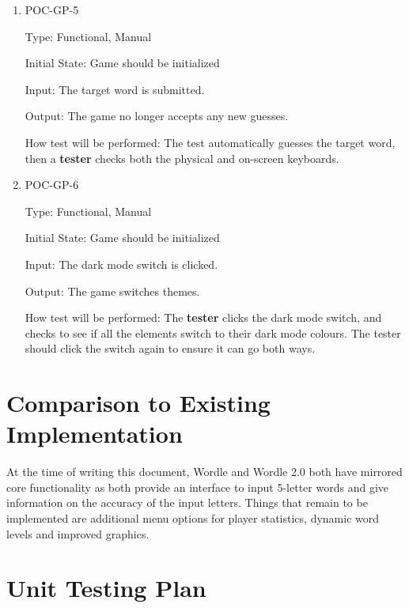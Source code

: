 \documentclass[12pt, titlepage]{article}
\begin{document}
\begin{enumerate}
\item{POC-GP-5}

Type: Functional, Manual
					
Initial State: Game should be initialized
					
Input: The target word is submitted.
					
Output: The game no longer accepts any new guesses.
					
How test will be performed: The test automatically guesses the target word, 
then a \textbf{tester} checks both the physical and on-screen keyboards.  

\item{POC-GP-6}

Type: Functional, Manual
					
Initial State: Game should be initialized
					
Input: The dark mode switch is clicked.
					
Output: The game switches themes.
					
How test will be performed: The \textbf{tester} clicks the dark mode switch,
and checks to see if all the elements switch to their dark mode colours. The tester
should click the switch again to ensure it can go both ways.

\end{enumerate}

	
\section{Comparison to Existing Implementation}	
At the time of writing this document, Wordle and Wordle 2.0 both have mirrored 
core functionality as both provide an interface to input 5-letter words and 
give information on the accuracy of the input letters. Things that remain to be 
implemented are additional menu options for player statistics, dynamic word 
levels and improved graphics.
\section{Unit Testing Plan}
		
\end{document}
